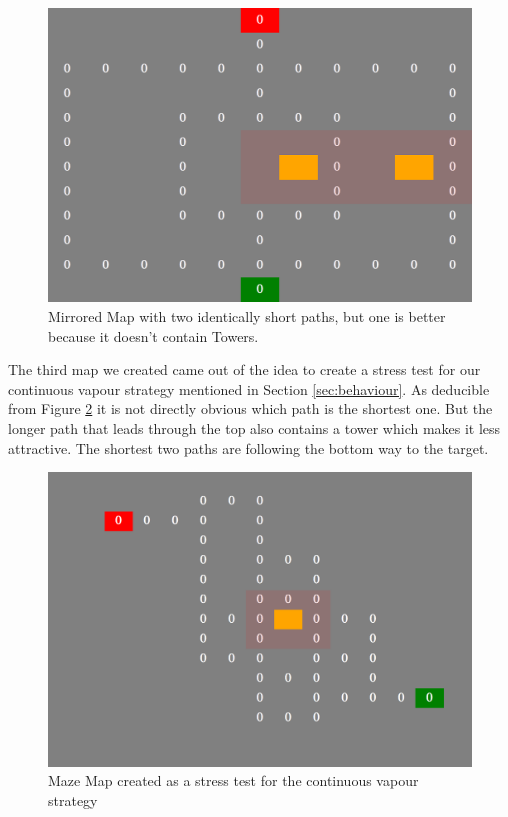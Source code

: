 \begin{figure}[H]
  \centering
  \includegraphics[width=1\linewidth]{images/map_mirror}
  \caption{Mirrored Map with two identically short paths, but one is better because it doesn't contain Towers.}
  \label{fig:mapsmirror}
\end{figure}


The third map we created came out of the idea to create a stress test for our continuous vapour strategy mentioned in Section \ref{sec:behaviour}. As deducible from Figure \ref{fig:mapsmaze} it is not directly obvious which path is the shortest one. But the longer path that leads through the top also contains a tower which makes it less attractive. The shortest two paths are following the bottom way to the target.

\begin{figure}[H]
  \centering
  \includegraphics[width=1\linewidth]{images/map_maze}
  \caption{Maze Map created as a stress test for the continuous vapour strategy}
  \label{fig:mapsmaze}
\end{figure}
